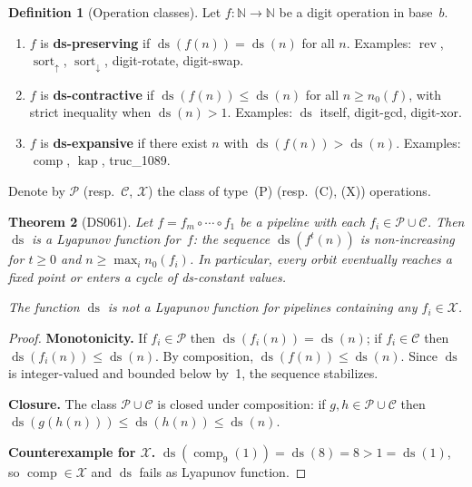 \documentclass[11pt,a4paper]{amsart}
\theoremstyle{plain}
\newtheorem{theorem}{Theorem}
\theoremstyle{definition}
\newtheorem{definition}[theorem]{Definition}
\theoremstyle{remark}
\DeclareMathOperator{\rev}{rev}
\DeclareMathOperator{\comp}{comp}
\DeclareMathOperator{\sort}{sort}
\DeclareMathOperator{\kap}{kap}
\DeclareMathOperator{\ds}{ds}
\begin{document}
\begin{definition}[Operation classes]\label{def:op-classes}
Let $f \colon \mathbb{N} \to \mathbb{N}$ be a digit operation in base~$b$.
\begin{enumerate}
\item[\textup{(P)}] $f$ is \textbf{ds-preserving} if $\ds(f(n)) = \ds(n)$
  for all $n$. Examples: $\rev$, $\sort_\uparrow$, $\sort_\downarrow$,
  digit-rotate, digit-swap.
\item[\textup{(C)}] $f$ is \textbf{ds-contractive} if $\ds(f(n)) \leq \ds(n)$
  for all $n \geq n_0(f)$, with strict inequality when $\ds(n) > 1$.
  Examples: $\ds$ itself, digit-gcd, digit-xor.
\item[\textup{(X)}] $f$ is \textbf{ds-expansive} if there exist $n$ with
  $\ds(f(n)) > \ds(n)$. Examples: $\comp$, $\kap$, truc\_1089.
\end{enumerate}
Denote by $\mathcal{P}$ (resp.\ $\mathcal{C}$, $\mathcal{X}$) the class of
type~(P) (resp.\ (C), (X)) operations.
\end{definition}

\begin{theorem}[DS061]\label{thm:lyapunov-cond}
Let $f = f_m \circ \cdots \circ f_1$ be a pipeline with each
$f_i \in \mathcal{P} \cup \mathcal{C}$. Then $\ds$ is a Lyapunov function
for~$f$: the sequence $\ds(f^t(n))$ is non-increasing for $t \geq 0$ and
$n \geq \max_i n_0(f_i)$. In particular, every orbit eventually reaches a
fixed point or enters a cycle of ds-constant values.

The function $\ds$ is \emph{not} a Lyapunov function for pipelines containing
any $f_i \in \mathcal{X}$.
\end{theorem}

\begin{proof}
\textbf{Monotonicity.}
If $f_i \in \mathcal{P}$ then $\ds(f_i(n)) = \ds(n)$; if
$f_i \in \mathcal{C}$ then $\ds(f_i(n)) \leq \ds(n)$. By composition,
$\ds(f(n)) \leq \ds(n)$. Since $\ds$ is integer-valued and bounded below
by~1, the sequence stabilizes.

\textbf{Closure.}
The class $\mathcal{P} \cup \mathcal{C}$ is closed under composition:
if $g, h \in \mathcal{P} \cup \mathcal{C}$ then
$\ds(g(h(n))) \leq \ds(h(n)) \leq \ds(n)$.

\textbf{Counterexample for $\mathcal{X}$.}
$\ds(\comp_9(1)) = \ds(8) = 8 > 1 = \ds(1)$,
so $\comp \in \mathcal{X}$ and $\ds$ fails as Lyapunov function.
\end{proof}
\end{document}
